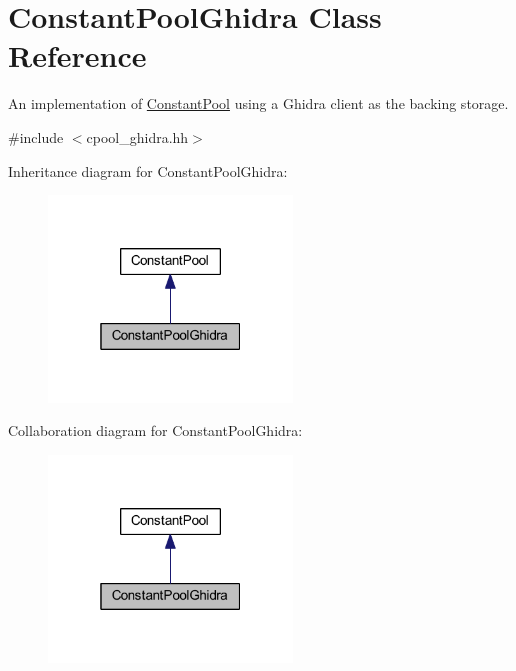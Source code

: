 \hypertarget{class_constant_pool_ghidra}{}\section{Constant\+Pool\+Ghidra Class Reference}
\label{class_constant_pool_ghidra}


An implementation of \mbox{\hyperlink{class_constant_pool}{Constant\+Pool}} using a Ghidra client as the backing storage.  




{\ttfamily \#include $<$cpool\+\_\+ghidra.\+hh$>$}



Inheritance diagram for Constant\+Pool\+Ghidra\+:
\nopagebreak
\begin{figure}[H]
\begin{center}
\leavevmode
\includegraphics[width=184pt]{class_constant_pool_ghidra__inherit__graph}
\end{center}
\end{figure}


Collaboration diagram for Constant\+Pool\+Ghidra\+:
\nopagebreak
\begin{figure}[H]
\begin{center}
\leavevmode
\includegraphics[width=184pt]{class_constant_pool_ghidra__coll__graph}
\end{center}
\end{figure}
